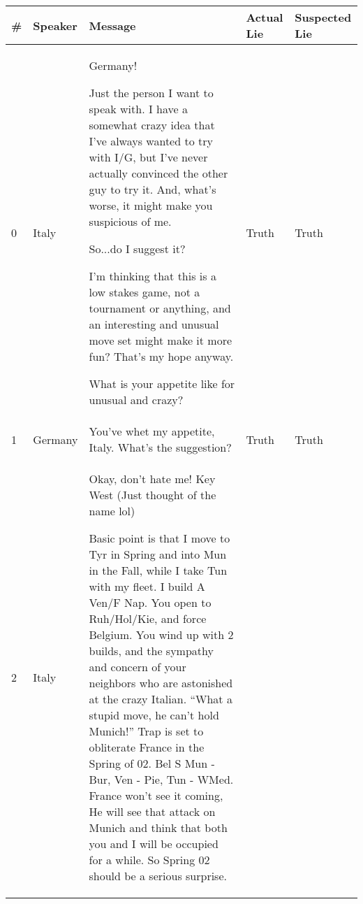 \clearpage
\onecolumn
{}
\begin{longtable}{p{.3 cm} p{1.25cm} p{8.25cm} p{1.1cm} p{1.1cm}}
		\label{tab:transcript}
		\bf \# & \bf Speaker & \bf  Message  & \bf Actual Lie & \bf Suspected Lie \\
		\toprule
		\endfirsthead
		0 & Italy & Germany!
		
		Just the person I want to speak with. I have a somewhat crazy idea that I've always wanted to try with I/G, but I've never actually convinced the other guy to try it. And, what's worse, it might make you suspicious of me. 
		
		So...do I suggest it?
		
		I'm thinking that this is a low stakes game, not a tournament or anything, and an interesting and unusual move set might make it more fun? That's my hope anyway.
		
		What is your appetite like for unusual and crazy? & Truth & Truth \\
		\hline
		1 & Germany & You've whet my appetite, Italy. What's the suggestion? & Truth & Truth \\
		\hline
		2 & Italy & Okay, don't hate me!  Key West (Just thought of the name lol)
		
		Basic point is that I move to Tyr in Spring and into Mun in the Fall, while I take Tun with my fleet. I build A Ven/F Nap. 
		You open to Ruh/Hol/Kie, and force Belgium. 
		You wind up with 2 builds, and the sympathy and concern of your neighbors who are astonished at the crazy Italian. ``What a stupid move, he can't hold Munich!''
		Trap is set to obliterate France in the Spring of 02. Bel S Mun - Bur, Ven - Pie, Tun - WMed. 
		France won't see it coming, He will see that attack on Munich and think that both you and I will be occupied for a while. So Spring 02 should be a serious surprise. 
		

\end{longtable}
